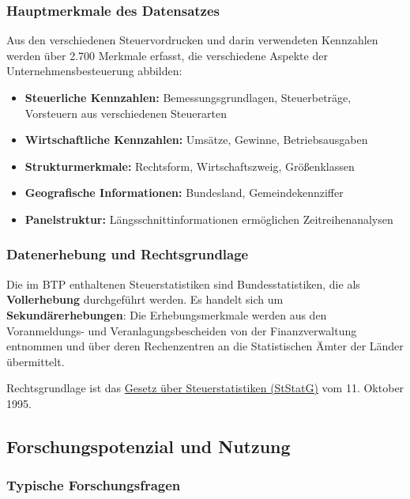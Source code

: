 \documentclass[
  ngerman,
  10pt,
  twocolumn]{article}
\providecommand{\tightlist}{%
  \setlength{\itemsep}{0pt}\setlength{\parskip}{0pt}}
\begin{document}
\subsubsection{Hauptmerkmale des
Datensatzes}\label{hauptmerkmale-des-datensatzes}

Aus den verschiedenen Steuervordrucken und darin verwendeten Kennzahlen
werden über 2.700 Merkmale erfasst, die verschiedene Aspekte der
Unternehmensbesteuerung abbilden:

\begin{itemize}
\tightlist
\item
  \textbf{Steuerliche Kennzahlen:} Bemessungsgrundlagen, Steuerbeträge,
  Vorsteuern aus verschiedenen Steuerarten
\item
  \textbf{Wirtschaftliche Kennzahlen:} Umsätze, Gewinne,
  Betriebsausgaben
\item
  \textbf{Strukturmerkmale:} Rechtsform, Wirtschaftszweig, Größenklassen
\item
  \textbf{Geografische Informationen:} Bundesland, Gemeindekennziffer
\item
  \textbf{Panelstruktur:} Längsschnittinformationen ermöglichen
  Zeitreihenanalysen
\end{itemize}

\subsubsection{Datenerhebung und
Rechtsgrundlage}\label{datenerhebung-und-rechtsgrundlage}

Die im BTP enthaltenen Steuerstatistiken sind Bundesstatistiken, die als
\textbf{Vollerhebung} durchgeführt werden. Es handelt sich um
\textbf{Sekundärerhebungen}: Die Erhebungsmerkmale werden aus den
Voranmeldungs- und Veranlagungsbescheiden von der Finanzverwaltung
entnommen und über deren Rechenzentren an die Statistischen Ämter der
Länder übermittelt.

Rechtsgrundlage ist das
\href{https://www.gesetze-im-internet.de/ststatg_1995/}{Gesetz über
Steuerstatistiken (StStatG)} vom 11. Oktober 1995.

\subsection{Forschungspotenzial und
Nutzung}\label{forschungspotenzial-und-nutzung}

\subsubsection{Typische
Forschungsfragen}\label{typische-forschungsfragen}
\end{document}
